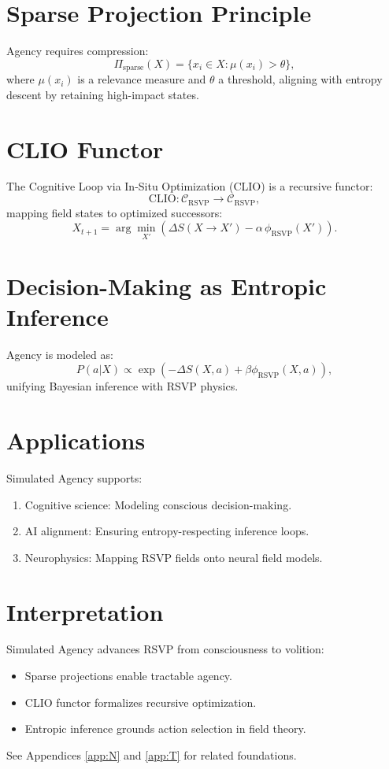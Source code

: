 \documentclass[12pt]{report}
\begin{document}
\section{Sparse Projection Principle}
Agency requires compression:
\[
\Pi_{\text{sparse}}(X) = \{ x_i \in X : \mu(x_i) > \theta \},
\]
where \(\mu(x_i)\) is a relevance measure and \(\theta\) a threshold, aligning with entropy descent by retaining high-impact states.

\section{CLIO Functor}
The Cognitive Loop via In-Situ Optimization (CLIO) is a recursive functor:
\[
\text{CLIO} : \mathcal{C}_{\text{RSVP}} \to \mathcal{C}_{\text{RSVP}},
\]
mapping field states to optimized successors:
\[
X_{t+1} = \arg\min_{X'} \left( \Delta S(X \to X') - \alpha \, \phi_{\text{RSVP}}(X') \right).
\]

\section{Decision-Making as Entropic Inference}
Agency is modeled as:
\begin{equation}
P(a|X) \propto \exp\left( -\Delta S(X,a) + \beta \phi_{\text{RSVP}}(X,a)\right),
\end{equation}
unifying Bayesian inference with RSVP physics.

\section{Applications}
Simulated Agency supports:
\begin{enumerate}
    \item Cognitive science: Modeling conscious decision-making.
    \item AI alignment: Ensuring entropy-respecting inference loops.
    \item Neurophysics: Mapping RSVP fields onto neural field models.
\end{enumerate}

\section{Interpretation}
Simulated Agency advances RSVP from consciousness to volition:
\begin{itemize}
    \item Sparse projections enable tractable agency.
    \item CLIO functor formalizes recursive optimization.
    \item Entropic inference grounds action selection in field theory.
\end{itemize}
See Appendices \ref{app:N} and \ref{app:T} for related foundations.
\end{document}
